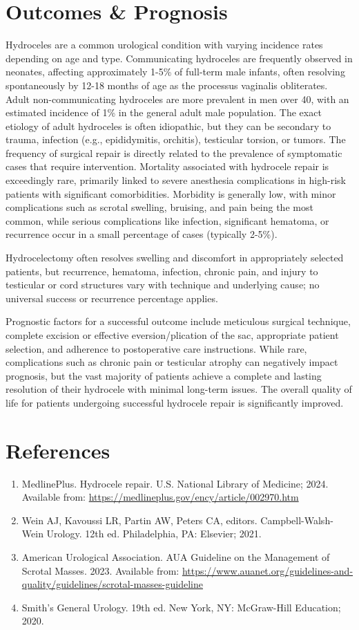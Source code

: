 \section*{Outcomes \& Prognosis}
Hydroceles are a common urological condition with varying incidence rates depending on age and type. Communicating hydroceles are frequently observed in neonates, affecting approximately 1-5\% of full-term male infants, often resolving spontaneously by 12-18 months of age as the processus vaginalis obliterates. Adult non-communicating hydroceles are more prevalent in men over 40, with an estimated incidence of 1\% in the general adult male population. The exact etiology of adult hydroceles is often idiopathic, but they can be secondary to trauma, infection (e.g., epididymitis, orchitis), testicular torsion, or tumors. The frequency of surgical repair is directly related to the prevalence of symptomatic cases that require intervention. Mortality associated with hydrocele repair is exceedingly rare, primarily linked to severe anesthesia complications in high-risk patients with significant comorbidities. Morbidity is generally low, with minor complications such as scrotal swelling, bruising, and pain being the most common, while serious complications like infection, significant hematoma, or recurrence occur in a small percentage of cases (typically 2-5\%).

Hydrocelectomy often resolves swelling and discomfort in appropriately selected patients, but recurrence, hematoma, infection, chronic pain, and injury to testicular or cord structures vary with technique and underlying cause; no universal success or recurrence percentage applies.

Prognostic factors for a successful outcome include meticulous surgical technique, complete excision or effective eversion/plication of the sac, appropriate patient selection, and adherence to postoperative care instructions. While rare, complications such as chronic pain or testicular atrophy can negatively impact prognosis, but the vast majority of patients achieve a complete and lasting resolution of their hydrocele with minimal long-term issues. The overall quality of life for patients undergoing successful hydrocele repair is significantly improved.

\section*{References}
\begin{enumerate}
  \item MedlinePlus. Hydrocele repair. U.S. National Library of Medicine; 2024. Available from: \url{https://medlineplus.gov/ency/article/002970.htm}
  \item Wein AJ, Kavoussi LR, Partin AW, Peters CA, editors. Campbell-Walsh-Wein Urology. 12th ed. Philadelphia, PA: Elsevier; 2021.
  \item American Urological Association. AUA Guideline on the Management of Scrotal Masses. 2023. Available from: \url{https://www.auanet.org/guidelines-and-quality/guidelines/scrotal-masses-guideline}
  \item Smith's General Urology. 19th ed. New York, NY: McGraw-Hill Education; 2020.
\end{enumerate}

\clearpage
